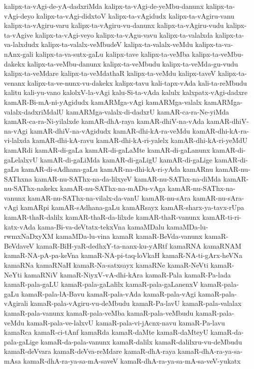 {kalipx-ta-vAgi-de-yA-dadxriMda
kalipx-ta-vAgi-de-yeMbu-danunx
kalipx-ta-vAgi-deyo
kalipx-ta-vAgi-didxtoV
kalipx-ta-vAgidudx
kalipx-ta-vAgiru-vanu
kalipx-ta-vAgiru-varu
kalipx-ta-vAgiru-vu-danunx
kalipx-ta-vAgiru-vudu
kalipx-ta-vAgive
kalipx-ta-vAgi-veyo
kalipx-ta-vAgu-vavu
kalipx-ta-valalxda
kalipx-ta-va-lalxdudx
kalipx-ta-valalx-veMbudeV
kalipx-ta-valalx-veMdu
kalipx-ta-va-nAnx-gali
kalipx-ta-va-sutx-gaLu
kalipx-tave
kalipx-ta-veMba
kalipx-ta-veMbu-dakekx
kalipx-ta-veMbu-danunx
kalipx-ta-veMbudu
kalipx-ta-veMda-gu-vudu
kalipx-ta-veMdare
kalipx-ta-veMdathaR
kalipx-ta-veMdu
kalipx-taveV
kalipx-ta-venanx
kalipx-ta-ve-nunx-vu-dakekx
kalipx-tavu
kali-tapx-vAda
kali-ta-reMbudu
kalitu
kali-yu-vano
kalolxV-la-vAgi
kalu-Si-ta-vAda
kalulx
kalxpatx-vAgi-dadxre
kamAR-Bi-mA-ni-yAgidudx
kamARMga-vAgi
kamARMga-valalx
kamARMga-valalx-dadxriMdalU
kamARMga-valalx-di-dadxrU
kamAR-ca-ra-Ne-yiMda
kamAR-ca-ra-Ni-yilalxde
kamAR-dhA-raya
kamAR-dhiV-na-vAda
kamAR-dhiV-na-vAgi
kamAR-dhiV-na-vAgidudx
kamAR-dhi-kA-ra-veMdu
kamAR-dhi-kA-ra-vi-lalxda
kamAR-dhi-kA-ravu
kamAR-dhi-kA-ri-yalelx
kamAR-dhi-kA-ri-yeMdU
kamARdi
kamAR-di-gaLa
kamAR-di-gaLaMte
kamAR-di-gaLanunx
kamAR-di-gaLelalxvU
kamAR-di-gaLiMda
kamAR-di-gaLigU
kamAR-di-gaLige
kamAR-di-gaLu
kamAR-di-sAdhana-gaLu
kamAR-na-dhi-kA-ri-yAda
kamARnu
kamAR-nu-SAThxna
kamAR-nu-SAThx-na-da-lilxyeV
kamAR-nu-SAThx-na-diMda
kamAR-nu-SAThx-nakekx
kamAR-nu-SAThx-na-mADu-vAga
kamAR-nu-SAThx-na-vanunx
kamAR-nu-SAThx-na-vilalx-da-vanU
kamAR-nu-sAra
kamAR-nu-sAra-vAgi
kamARpi
kamAR-sAdhana-gaLu
kamARsayx
kamAR-sharx-ya-tavx-rUpa
kamAR-thaR-dalilx
kamAR-thaR-da-lilxde
kamAR-thaR-vanunx
kamAR-ti-ri-katx-vAda
kama-Bi-va-deVtatx-tekxVna
kamaMDalu
kamaMDa-lu-rwmxNaDxyXM
kamaMDa-lu-vina
kamaR
kamaR-BeVda-vanunx
kamaR-BeVdaveV
kamaR-BiH-yaR-dedhxY-ta-nanx-ku-yARtf
kamaRNA
kamaRNAM
kamaR-NA-pA-pa-keVna
kamaR-NA-pi-taq-loVkaH
kamaR-NA-ti-gArx-heVNa
kamaRNa
kamaRNaH
kamaR-Na-satxsayx
kamaRNe
kamaR-NeVti
kamaR-NeYti
kamaRNiV
kamaR-NiyxV-vA-dhi-kAra
kamaR-Pala
kamaR-Pa-lada
kamaR-pala-gaLU
kamaR-pala-gaLalilx
kamaR-pala-gaLanenxV
kamaR-pala-gaLu
kamaR-pala-lA-Bavu
kamaR-pala-vAda
kamaR-pala-vAgi
kamaR-pala-vAgirali
kamaR-pala-vAgiru-vu-deMbudu
kamaR-Pa-lavU
kamaR-pala-valalax
kamaR-pala-vanunx
kamaR-pala-veMba
kamaR-pala-veMbudu
kamaR-pala-veMdu
kamaR-pala-ve-lalxvU
kamaR-pala-vi-jAcnx-navu
kamaR-Pa-lavu
kamaRca
kamaR-ci-tAnf
kamaRda
kamaR-daMte
kamaR-daMteyU
kamaR-da-pala-gaLige
kamaR-da-pala-vanunx
kamaR-dalilx
kamaR-dalilxru-vu-deMbudu
kamaR-deVvara
kamaR-deVva-reMdare
kamaR-dhA-raya
kamaR-dhA-ra-ya-sa-mAsa
kamaR-dhA-ra-ya-sa-mA-saveV
kamaR-dhA-ra-ya-sa-mA-sa-veV-yukatx
}
